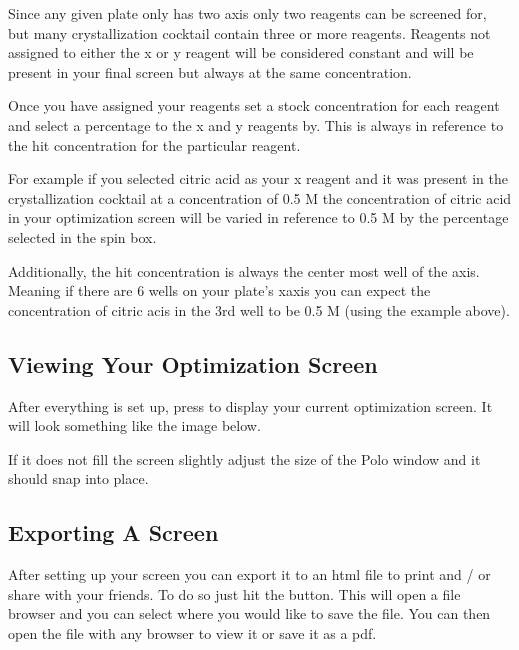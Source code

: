 \documentclass[letterpaper,10pt,english]{sphinxmanual}
\begin{document}
Since any given plate only has two axis only two reagents can be screened for,
but many crystallization cocktail contain three or more reagents. Reagents not
assigned to either the x or y reagent will be considered constant and will
be present in your final screen but always at the same concentration.

Once you have assigned your reagents set a stock concentration for each reagent and
select a percentage to the x and y reagents by. This is always in reference to the
hit concentration for the particular reagent.

For example if you selected citric acid as your x reagent and it was present
in the crystallization cocktail at a concentration of 0.5 M the concentration
of citric acid in your optimization screen will be varied in reference to
0.5 M by the percentage selected in the  spin box.

Additionally, the hit concentration is always the center most well of the
axis. Meaning if there are 6 wells on your plate’s x\sphinxhyphen{}axis you can expect
the concentration of citric acis in the 3rd well to be 0.5 M (using the
example above).


\subsection{Viewing Your Optimization Screen}
\label{\detokenize{user_guide:viewing-your-optimization-screen}}
After everything is set up, press  to display your
current optimization screen. It will look something like the image below.
\begin{quote}

\noindent{}
\end{quote}

If it does not fill the screen slightly adjust the size of the Polo window and
it should snap into place.


\subsection{Exporting A Screen}
\label{\detokenize{user_guide:exporting-a-screen}}
After setting up your screen you can export it to an html file to print
and / or share with your friends. To do so just hit the  button.
This will open a file browser and you can select where you would like to
save the file. You can then open the file with any browser to view it or
save it as a pdf.
\end{document}
